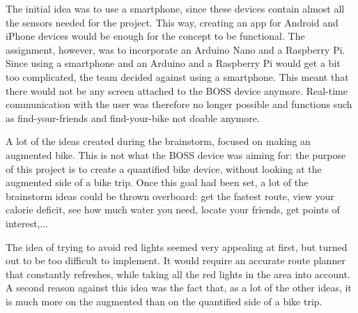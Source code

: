 The initial idea was to use a smartphone, since these devices contain almost all the sensors needed for the project. 
This way, creating an app for Android and iPhone devices would be enough for the concept to be functional. 
The assignment, however, was to incorporate an Arduino Nano and a Raspberry Pi. 
Since using a smartphone and an Arduino and a Raspberry Pi would get a bit too complicated, the team decided against using a smartphone. 
This meant that there would not be any screen attached to the BOSS device anymore. 
Real-time communication with the user was therefore no longer possible and functions such as find-your-friends and find-your-bike not doable anymore. 

A lot of the ideas created during the brainstorm, focused on making an augmented bike. 
This is not what the BOSS device was aiming for: the purpose of this project is to create a quantified bike device, without looking at the augmented side of a bike trip. 
Once this goal had been set, a lot of the brainstorm ideas could be thrown overboard: get the fastest route, view your calorie deficit, see how much water you need, locate your friends, get points of interest,...

The idea of trying to avoid red lights seemed very appealing at first, but turned out to be too difficult to implement. 
It would require an accurate route planner that constantly refreshes, while taking all the red lights in the area into account. 
A second reason against this idea was the fact that, as a lot of the other ideas, it is much more on the augmented than on the quantified side of a bike trip. 
